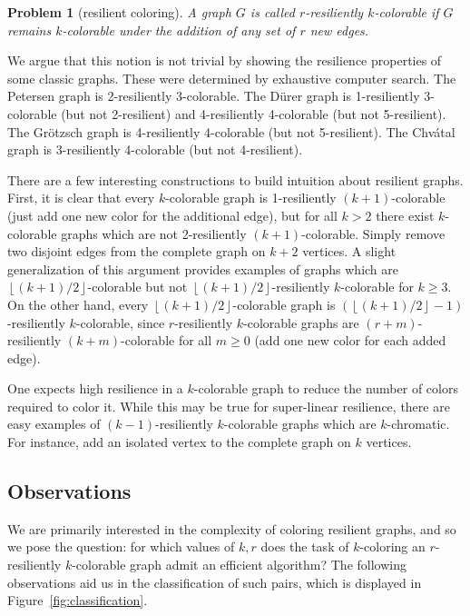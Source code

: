 \documentclass{llncs}
\newtheorem{prob}{Problem}
\begin{document}
\begin{prob}[resilient coloring] 
A graph $G$ is called \emph{$r$-resiliently $k$-colorable} if $G$ remains
$k$-colorable under the addition of any set of $r$ new edges.
\end{prob}

We argue that this notion is not trivial by showing the resilience properties
of some classic graphs. These were determined by exhaustive computer search.
The Petersen graph is 2-resiliently 3-colorable. The D{\"u}rer graph is
1-resiliently 3-colorable (but not 2-resilient) and 4-resiliently 4-colorable
(but not 5-resilient). The Gr{\"o}tzsch graph is 4-resiliently 4-colorable (but
not 5-resilient). The Chv{\'a}tal graph is 3-resiliently 4-colorable (but not
4-resilient).

There are a few interesting constructions to build intuition about resilient
graphs. First, it is clear that every $k$-colorable graph is 1-resiliently
$(k+1)$-colorable (just add one new color for the additional edge), but for all
$k > 2$ there exist $k$-colorable graphs which are not 2-resiliently
$(k+1)$-colorable. Simply remove two disjoint edges from the complete graph on
$k+2$ vertices. A slight generalization of this argument provides examples of
graphs which are $\left \lfloor (k+1)/2\right \rfloor$-colorable but not $\left
\lfloor (k+1)/2 \right \rfloor$-resiliently $k$-colorable for $k \geq 3$.  On
the other hand, every $\left \lfloor (k+1)/2\right \rfloor$-colorable graph is
$(\left \lfloor (k+1)/2 \right \rfloor-1)$-resiliently $k$-colorable, since
$r$-resiliently $k$-colorable graphs are $(r+m)$-resiliently $(k+m)$-colorable
for all $m \geq 0$ (add one new color for each added edge). 

One expects high resilience in a $k$-colorable graph to reduce the number of
colors required to color it. While this may be true for super-linear
resilience, there are easy examples of $(k-1)$-resiliently $k$-colorable graphs
which are $k$-chromatic. For instance, add an isolated vertex to the complete
graph on $k$ vertices. 

\subsection{Observations}

We are primarily interested in the complexity of coloring resilient graphs, and
so we pose the question: for which values of $k,r$ does the task of
$k$-coloring an $r$-resiliently $k$-colorable graph admit an efficient
algorithm? The following observations aid us in the classification of such
pairs, which is displayed in Figure~\ref{fig:classification}.
\end{document}
